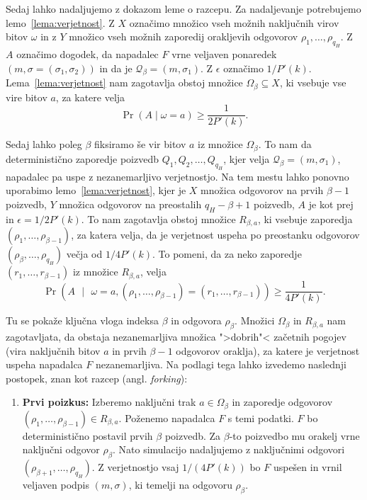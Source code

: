 \begin{dokaz}
    Sedaj lahko nadaljujemo z dokazom leme o razcepu. Za nadaljevanje potrebujemo lemo~\ref{lema:verjetnost}.
    Z $X$ označimo množico vseh možnih naključnih virov bitov $\omega$ in z $Y$ množico vseh
    možnih zaporedij orakljevih odgovorov $\rho_1, \dots, \rho_{q_H}$. Z $A$ označimo dogodek, da napadalec
    $F$ vrne veljaven ponaredek $(m, \sigma = (\sigma_1, \sigma_2))$ in da je $\mathcal{Q}_\beta =
    (m, \sigma_1)$. Z $\epsilon$ označimo $1/P'(k)$. Lema~\ref{lema:verjetnost} nam zagotavlja obstoj
    množice $\Omega_\beta \subseteq X$, ki vsebuje vse vire bitov $a$, za katere velja
    $$
    \Pr(A \mid \omega = a) \geq \frac{1}{2P'(k)}.
    $$

    Sedaj lahko poleg $\beta$ fiksiramo še vir bitov $a$ iz množice $\Omega_\beta$. To nam da
    deterministično zaporedje poizvedb $Q_1, Q_2, \dots, Q_{q_H}$, kjer velja $\mathcal{Q}_\beta =
    (m, \sigma_1)$, napadalec pa uspe z nezanemarljivo verjetnostjo. Na tem mestu lahko ponovno
    uporabimo lemo~\ref{lema:verjetnost}, kjer je $X$ množica odgovorov na prvih $\beta - 1$ poizvedb,
    $Y$ množica odgovorov na preostalih $q_H - \beta + 1$ poizvedb, $A$ je kot prej in $\epsilon = 1/2P'(k)$.
    To nam zagotavlja obstoj množice $R_{\beta, a}$, ki vsebuje zaporedja $(\rho_1, \dots,
    \rho_{\beta - 1})$, za katera velja, da je verjetnost uspeha po preostanku odgovorov $(\rho_\beta,
    \dots, \rho_{q_H})$ večja od $1/4P'(k)$. To pomeni, da za neko zaporedje $(r_1, \dots, r_{\beta - 1})$
    iz množice $R_{\beta, a}$, velja
    $$
    \Pr(A \text{ }|\text{ } \omega = a, (\rho_1, \dots, \rho_{\beta - 1}) = (r_1, \dots, r_{\beta - 1})) \geq \frac{1}{4P'(k)}.
    $$

    Tu se pokaže ključna vloga indeksa $\beta$ in odgovora $\rho_\beta$. Množici
    $\Omega_\beta$ in $R_{\beta,a}$ nam zagotavljata, da obstaja nezanemarljiva množica
    ">dobrih"< začetnih pogojev (vira naključnih bitov $a$ in prvih $\beta-1$ odgovorov oraklja),
    za katere je verjetnost uspeha napadalca $F$ nezanemarljiva. Na podlagi tega lahko izvedemo
    naslednji postopek, znan kot razcep (angl. \emph{forking}):

    \begin{enumerate}
        \item \textbf{Prvi poizkus:} Izberemo naključni trak $a \in \Omega_\beta$ in zaporedje
            odgovorov $(\rho_1, \dots, \rho_{\beta-1}) \in R_{\beta,a}$. Poženemo napadalca $F$
            s temi podatki. $F$ bo deterministično postavil prvih $\beta$ poizvedb. Za $\beta$-to
            poizvedbo mu orakelj vrne naključni odgovor $\rho_\beta$. Nato simulacijo nadaljujemo
            z naključnimi odgovori $(\rho_{\beta+1}, \dots, \rho_{q_H})$. Z verjetnostjo vsaj
            $1/(4P'(k))$ bo $F$ uspešen in vrnil veljaven podpis $(m, \sigma)$, ki temelji na
            odgovoru $\rho_\beta$.


\end{enumerate}
\end{dokaz}
